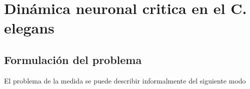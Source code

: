 \chapter{Dinámica neuronal critica en el C. elegans}
\graphicspath{{figs/}}


\label{titulo-cap-2}


\section{Formulaci\'{o}n del problema}
\label{S:form-del-probl}

El problema de la medida se puede describir informalmente del siguiente modo 

